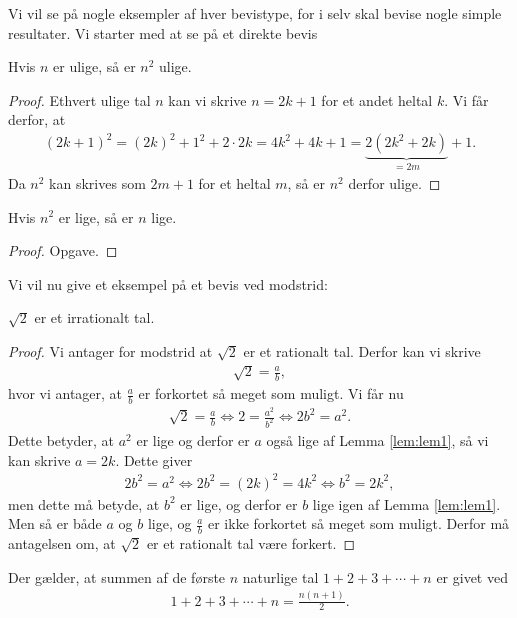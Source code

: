 Vi vil se på nogle eksempler af hver bevistype, for i selv skal bevise nogle simple resultater. Vi starter med at se på et direkte bevis
\begin{setn}
Hvis $n$ er ulige, så er $n^2$ ulige.
\end{setn}
\begin{proof}
Ethvert ulige tal $n$ kan vi skrive $n = 2k+1$ for et andet heltal $k$. Vi får derfor, at 
\begin{align*}
(2k+1)^2 = (2k)^2+1^2+2\cdot 2k =4k^2+4k+1= \underbrace{2(2k^2+2k)}_{=2m}+1.
\end{align*}
Da $n^2$ kan skrives som $2m+1$ for et heltal $m$, så er $n^2$ derfor ulige. 
\end{proof}
\begin{lem}\label{lem:lem1}
Hvis $n^2$ er lige, så er $n$ lige.
\end{lem}
\begin{proof}
Opgave.
\end{proof}
Vi vil nu give et eksempel på et bevis ved modstrid:
\begin{setn}
$\sqrt{2}$ er et irrationalt tal. 
\end{setn}
\begin{proof}
Vi antager for modstrid at $\sqrt{2}$ er et rationalt tal. Derfor kan vi skrive
\begin{align*}
\sqrt{2} = \frac{a}{b},
\end{align*}
hvor vi antager, at $\frac{a}{b}$ er forkortet så meget som muligt. Vi får nu
\begin{align*}
\sqrt{2} = \frac{a}{b} \Leftrightarrow 2 = \frac{a^2}{b^2} \Leftrightarrow 2b^2 = a^2.
\end{align*}
Dette betyder, at $a^2$ er lige og derfor er $a$ også lige af Lemma \ref{lem:lem1}, så vi kan skrive $a = 2k$. Dette giver
\begin{align*}
2b^2 = a^2 \Leftrightarrow 2b^2 = (2k)^2 = 4k^2 \Leftrightarrow b^2 = 2k^2,
\end{align*}
men dette må betyde, at $b^2$ er lige, og derfor er $b$ lige igen af Lemma \ref{lem:lem1}. Men så er både $a$ og $b$ lige, og $\frac{a}{b}$ er ikke forkortet så meget som muligt. Derfor må antagelsen om, at $\sqrt{2}$ er et rationalt tal være forkert. 
\end{proof}
\begin{setn}
Der gælder, at summen af de første $n$ naturlige tal $1+2+3+\cdots+n$ er givet ved
\begin{align*}
1+2+3+\cdots+n = \frac{n(n+1)}{2}.
\end{align*}
\end{setn}
